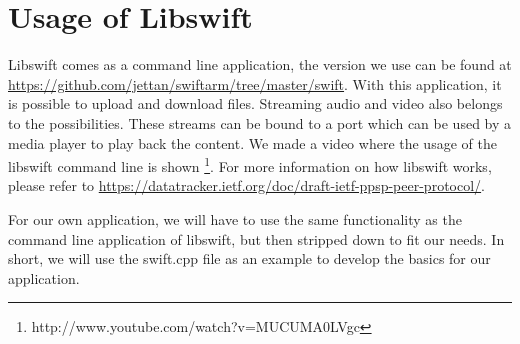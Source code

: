 \chapter*{Usage of Libswift}

Libswift comes as a command line application, the version we use can be 
found at 
\url{https://github.com/jettan/swiftarm/tree/master/swift}. With 
this application, it is possible to upload and download files. Streaming 
audio and video also belongs to the possibilities. These streams can be 
bound to a port which can be used by a media player to play back the 
content. We made a video where the usage of the libswift command line is 
shown \footnote{http://www.youtube.com/watch?v=MUCUMA0LVgc}. For more 
information on how libswift works, please refer to 
\url{https://datatracker.ietf.org/doc/draft-ietf-ppsp-peer-protocol/}.

For our own application, we will have to use the same functionality as 
the command line application of libswift, but then stripped down to fit 
our needs. In short, we will use the swift.cpp file as an example to 
develop the basics for our application.